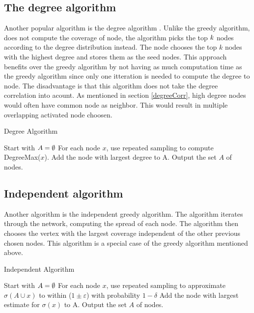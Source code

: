 {\subsection{The degree algorithm}
Another popular algorithm is the degree algorithm \cite{greedyInfluenc2005}. Unlike the greedy algorithm, does not compute the coverage of node, the algorithm picks the top $\it{k}$ nodes according to the degree distribution instead. The node chooses the top $k$ nodes with the highest degree and stores them as the seed nodes. This approach benefits over the greedy algorithm by not having as much computation time as the greedy algorithm since only one itteration is needed to compute the degree to node. The disadvantage is that this algorithm does not take the degree correlation into acount. As mentioned in section \ref{degreeCorr}, high degree nodes would often have common node as neighbor. This would result in multiple overlapping activated node choosen.

\begin{algorithm}
\caption{Degree Algorithm}
\begin{algorithmic}[1]
\State Start with $A = \emptyset$
\State For each node $x$, use repeated sampling to compute DegreeMax($x$).
\State Add the node with largest degree to A.
\EndWhile
\State Output the set $A$ of nodes.
\end{algorithmic}
\end{algorithm}

\subsection{Independent algorithm}
Another algorithm is the independent greedy algorithm. The algorithm iterates through the network, computing the spread of each node. The algorithm then chooses the vertex with the largest coverage independent of the other previous chosen nodes. This algorithm is a special case of the greedy algorithm mentioned above.

\begin{algorithm}
\caption{Independent Algorithm}
\begin{algorithmic}[1]
\State Start with $A = \emptyset$
\State For each node $x$, use repeated sampling to approximate $\sigma(A \cup {x}) $ to within ($1 \pm \varepsilon$) with probability
$1 − \delta$
\State Add the node with largest estimate for $\sigma({x})$ to A.
\EndWhile
\State Output the set $A$ of nodes.
\end{algorithmic}
\end{algorithm}


}
